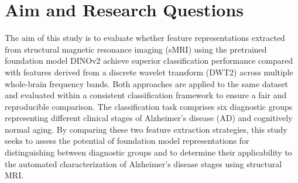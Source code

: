 \section{Aim and Research Questions}
\label{sec:aim}
The aim of this study is to evaluate whether feature representations extracted from structural magnetic resonance imaging (sMRI) 
using the pretrained foundation model DINOv2 achieve superior classification performance compared with features derived from a discrete wavelet transform (DWT2) 
across multiple whole-brain frequency bands. Both approaches are applied to the same dataset and evaluated within a consistent classification framework to ensure 
a fair and reproducible comparison. The classification task comprises six diagnostic groups representing different clinical stages of Alzheimer’s disease (AD) and 
cognitively normal aging. By comparing these two feature extraction strategies, this study seeks to assess the potential of foundation model representations for 
distinguishing between diagnostic groups and to determine their applicability to the automated characterization of Alzheimer’s disease stages using structural MRI. 
